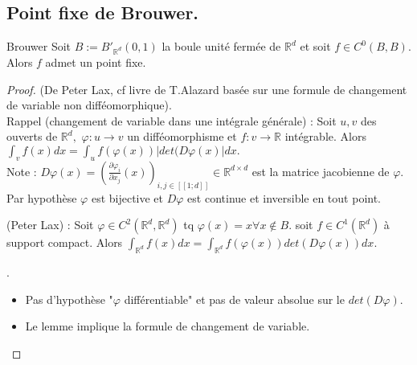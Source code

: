 \subsection{Point fixe de Brouwer.}
\begin{theoreme}{Brouwer}
    Soit $B:=B'_{\mathbb{R} ^d}(0,1)$ la boule unité fermée de $\mathbb{R} ^d$ et soit $f\in C^0(B,B).$ Alors $f$ admet un point fixe.
\end{theoreme}
\begin{proof}
    (De Peter Lax, cf livre de T.Alazard basée sur une formule de changement de variable non difféomorphique).\\
    Rappel (changement de variable dans une intégrale générale) : Soit $u,v$ des ouverts de $\mathbb{R} ^d,$ $\varphi :u\to v$ un difféomorphisme et $f:v\to \mathbb{R} $ intégrable. Alors $\int_vf(x)dx=\int_uf(\varphi (x))|det(D\varphi (x)|dx. $\\
    Note : $D\varphi (x)=\left( \frac{\partial \varphi _i}{\partial x_j}(x) \right)_{i,j\in [\![1;d]\!]}\in \mathbb{R} ^{d\times d} $ est la matrice jacobienne de $\varphi .$ \\
    Par hypothèse $\varphi $ est bijective et $D\varphi $ est continue et inversible en tout point.
    \begin{lemme}
        (Peter Lax) : Soit $\varphi \in C^2(\mathbb{R} ^d,\mathbb{R} ^d)$ tq $\varphi (x)=x\forall x\not\in B.$ soit $f\in C^1(\mathbb{R} ^d)$ à support compact. Alors $\int_{\mathbb{R} ^d}f(x)dx=\int_{\mathbb{R} ^d}f(\varphi (x))det(D\varphi (x))dx.$
    \end{lemme}
    \begin{remarque}
        .
        \begin{itemize}
            \item Pas d'hypothèse "$\varphi$ différentiable" et pas de valeur absolue sur le $det(D\varphi )$.
            \item Le lemme implique la formule de changement de variable.
        \end{itemize}
    \end{remarque}
\end{proof}

